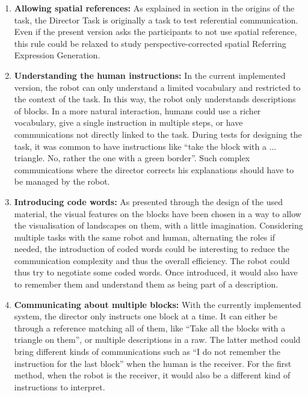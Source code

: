 \begin{enumerate}
\item \textbf{Allowing spatial references:} As explained in section in the origins of the task, the Director Task is originally a task to test referential communication. Even if the present version asks the participants to not use spatial reference, this rule could be relaxed to study perspective-corrected spatial Referring Expression Generation.\label{chal:spatial_ref}

\item \textbf{Understanding the human instructions:} In the current implemented version, the robot can only understand a limited vocabulary and restricted to the context of the task. In this way, the robot only understands descriptions of blocks. In a more natural interaction, humans could use a richer vocabulary, give a single instruction in multiple steps, or have communications not directly linked to the task. During tests for designing the task, it was common to have instructions like ``take the block with a ... triangle. No, rather the one with a green border''. Such complex communications where the director corrects his explanations should have to be managed by the robot.\label{chal:understand}

\item \textbf{Introducing code words:} As presented through the design of the used material, the visual features on the blocks have been chosen in a way to allow the visualisation of landscapes on them, with a little imagination. Considering multiple tasks with the same robot and human, alternating the roles if needed, the introduction of coded words could be interesting to reduce the communication complexity and thus the overall efficiency. The robot could thus try to negotiate some coded words. Once introduced, it would also have to remember them and understand them as being part of a description. \label{chal:words}

\item \textbf{Communicating about multiple blocks:} With the currently implemented system, the director only instructs one block at a time. It can either be through a reference matching all of them, like ``Take all the blocks with a triangle on them'', or multiple descriptions in a raw. The latter method could bring different kinds of communications such as ``I do not remember the instruction for the last block'' when the human is the receiver. For the first method, when the robot is the receiver, it would also be a different kind of instructions to interpret.\label{chal:multi}
\end{enumerate}


